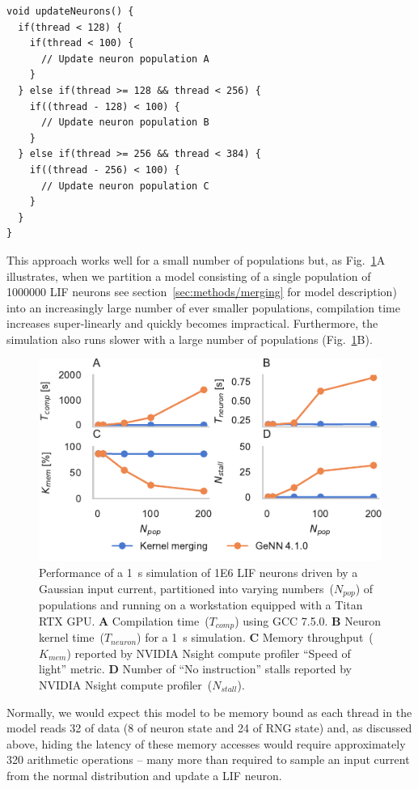 \documentclass[9pt,a4paper]{amsart}
\begin{document}
\begin{lstlisting}
void updateNeurons() {
  if(thread < 128) {
    if(thread < 100) {
      // Update neuron population A
    }
  } else if(thread >= 128 && thread < 256) {
    if((thread - 128) < 100) {
      // Update neuron population B
    }
  } else if(thread >= 256 && thread < 384) {
    if((thread - 256) < 100) {
      // Update neuron population C
    }
  }
}
\end{lstlisting}
%
This approach works well for a small number of populations but, as Fig.~\ref{fig:merging_scaling}A illustrates, when we partition a model consisting of a single population of \num{1000000} LIF neurons see section~\ref{sec:methods/merging} for model description) into an increasingly large number of ever smaller populations, compilation time increases super-linearly and quickly becomes impractical.
Furthermore, the simulation also runs slower with a large number of populations (Fig.~\ref{fig:merging_scaling}B).
%
\begin{figure}
    \centering
    \includegraphics{figures/merging_scaling}
    \caption{Performance of a \SI{1}{\second} simulation of \num{1E6} LIF neurons driven by a Gaussian input current, partitioned into varying numbers~($N_{pop}$) of populations and running on a workstation equipped with a Titan RTX GPU.
    \textbf{A} Compilation time~($T_{comp}$) using GCC 7.5.0.
    \textbf{B} Neuron kernel time~($T_{neuron}$) for a \SI{1}{\second} simulation.
    \textbf{C} Memory throughput~($K_{mem}$) reported by NVIDIA Nsight compute profiler ``Speed of light'' metric.
    \textbf{D} Number of ``No instruction'' stalls reported by NVIDIA Nsight compute profiler~($N_{stall}$).}
    \label{fig:merging_scaling}
\end{figure}
%
Normally, we would expect this model to be memory bound as each thread in the model reads \SI{32}{\byte} of data (\SI{8}{\byte} of neuron state and \SI{24}{\byte} of RNG state) and, as discussed above, hiding the latency of these memory accesses would require approximately 320 arithmetic operations -- many more than required to sample an input current from the normal distribution and update a LIF neuron.
\end{document}
